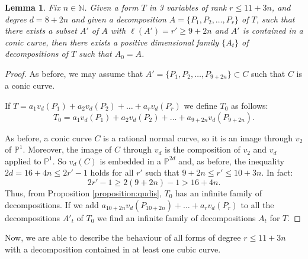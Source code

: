\documentclass[a4paper,10pt,oneside]{article}
\theoremstyle{casep}
\newcommand{\Pj}{\mathbb{P}}
\newcommand{\N}{\mathbb{N}}
\newtheorem{lemma}[theorem]{Lemma}
\theoremstyle{definition}
\begin{document}
\begin{lemma}
	\label{lemma:3}
	Fix $ n \in \N $. Given a form $T$ in 3 variables of rank $ r \leq 11+3n $, and degree $d = 8+2n $ and given a decomposition $A= \{ P_1,P_2, \dots , P_{r} \}$ of $T$, such that there exists a subset $ A' $ of $ A $ with $ \ell(A')=r'\geq 9+2n $ and $A'$ is contained in a conic curve, then there exists a positive dimensional family $ \{ A_t \}$ of decompositions of $T$ such that $A_0=A$.
\end{lemma}
\begin{proof} As before, we may assume that $ A' = \{ P_1, P_2, \dots, P_{9+2n}\} \subset C$ such that $ C $ is a conic curve.

If $ T= a_1 v_d(P_1)+a_2v_d(P_2)+\dots +a_r v_d(P_r) $ we define $ T_0 $ as follows: $$ T_0=a_1 v_d(P_1)+a_2v_d(P_2)+\dots +a_{9+2n} v_d(P_{9+2n}).$$
	

As before, a conic curve $C$ is a rational normal curve, so it is an image through $v_2$ of $\Pj^1$. Moreover, the image of $C$ through $v_d$ is the composition of $v_2$ and $v_d$ applied to $\Pj^1$. So $v_d(C)$ is embedded in a $\Pj^ {2d}$ and, as before, the inequality $2d=16+4n \leq 2r'-1$ holds for all $r'$ such that $9+2n \leq r' \leq 10+3n$.
In fact:
$$2r'-1 \geq 2(9+2n)-1 > 16+4n. $$
Thus, from Proposition \ref{proposition:qudis}, $ T_0 $ has an infinite family of decompositions. If we add $ a_{10+2n} v_d(P_{10+2n})+\dots +a_r v_d(P_r) $ to all the decompositions $A'_t$ of $ T_0 $ we find an infinite family of decompositions $A_t$ for $T$.


\end{proof}

Now, we are able to describe the behaviour of all forms of degree $r \leq 11+3n$ with a decomposition contained in at least one cubic curve.
\end{document}
